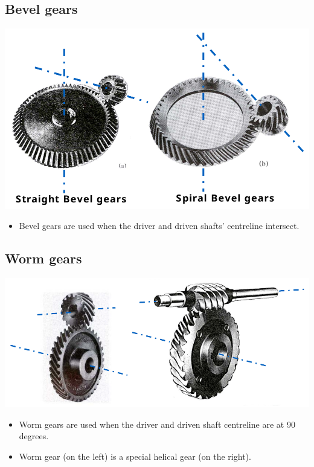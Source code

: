 \documentclass[11pt]{article}
\begin{document}
\subsection{Bevel gears}
\label{sec:orgd55531f}
\begin{center}
\includegraphics[width=.9\linewidth]{./images/straight-and-spiral-bevel-gears.png}
\end{center}
\begin{itemize}
\item Bevel gears are used when the driver and driven shafts' centreline intersect.
\end{itemize}
\subsection{Worm gears}
\label{sec:orge06b919}
\begin{center}
\includegraphics[width=.9\linewidth]{./images/worm-gears.png}
\end{center}
\begin{itemize}
\item Worm gears are used when the driver and driven shaft centreline are at 90 degrees.
\item Worm gear (on the left) is a special helical gear (on the right).
\end{itemize}
\end{document}
